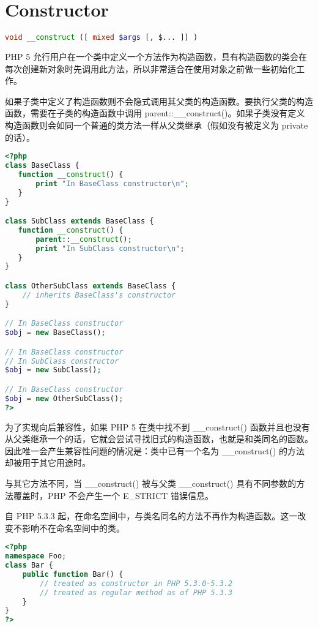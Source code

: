 \section{Constructor}





\begin{lstlisting}[language=PHP]
void __construct ([ mixed $args [, $... ]] )
\end{lstlisting}

PHP 5 允行用户在一个类中定义一个方法作为构造函数，具有构造函数的类会在每次创建新对象时先调用此方法，所以非常适合在使用对象之前做一些初始化工作。



如果子类中定义了构造函数则不会隐式调用其父类的构造函数。要执行父类的构造函数，需要在子类的构造函数中调用 parent::\_\_construct()。如果子类没有定义构造函数则会如同一个普通的类方法一样从父类继承（假如没有被定义为 private 的话）。


\begin{lstlisting}[language=PHP]
<?php
class BaseClass {
   function __construct() {
       print "In BaseClass constructor\n";
   }
}

class SubClass extends BaseClass {
   function __construct() {
       parent::__construct();
       print "In SubClass constructor\n";
   }
}

class OtherSubClass extends BaseClass {
    // inherits BaseClass's constructor
}

// In BaseClass constructor
$obj = new BaseClass();

// In BaseClass constructor
// In SubClass constructor
$obj = new SubClass();

// In BaseClass constructor
$obj = new OtherSubClass();
?>
\end{lstlisting}


为了实现向后兼容性，如果 PHP 5 在类中找不到 \_\_construct() 函数并且也没有从父类继承一个的话，它就会尝试寻找旧式的构造函数，也就是和类同名的函数。因此唯一会产生兼容性问题的情况是：类中已有一个名为 \_\_construct() 的方法却被用于其它用途时。

与其它方法不同，当 \_\_construct() 被与父类 \_\_construct() 具有不同参数的方法覆盖时，PHP 不会产生一个 E\_STRICT 错误信息。

自 PHP 5.3.3 起，在命名空间中，与类名同名的方法不再作为构造函数。这一改变不影响不在命名空间中的类。

\begin{lstlisting}[language=PHP]
<?php
namespace Foo;
class Bar {
    public function Bar() {
        // treated as constructor in PHP 5.3.0-5.3.2
        // treated as regular method as of PHP 5.3.3
    }
}
?>
\end{lstlisting}



